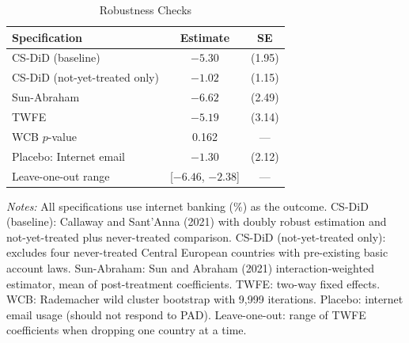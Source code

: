 \begin{table}[htbp]
\centering
\caption{Robustness Checks}
\label{tab:robustness}
\begin{tabular}{lcc}
\hline\hline
Specification & Estimate & SE \\
\hline
CS-DiD (baseline) & $-5.30$ & (1.95) \\
CS-DiD (not-yet-treated only) & $-1.02$ & (1.15) \\
Sun-Abraham & $-6.62$ & (2.49) \\
TWFE & $-5.19$ & (3.14) \\
WCB $p$-value & 0.162 & --- \\
Placebo: Internet email & $-1.30$ & (2.12) \\
Leave-one-out range & [$-6.46$, $-2.38$] & --- \\
\hline\hline
\end{tabular}
\begin{tablenotes}
\item \textit{Notes:} All specifications use internet banking (\%) as the outcome. CS-DiD (baseline): Callaway and Sant'Anna (2021) with doubly robust estimation and not-yet-treated plus never-treated comparison. CS-DiD (not-yet-treated only): excludes four never-treated Central European countries with pre-existing basic account laws. Sun-Abraham: Sun and Abraham (2021) interaction-weighted estimator, mean of post-treatment coefficients. TWFE: two-way fixed effects. WCB: Rademacher wild cluster bootstrap with 9,999 iterations. Placebo: internet email usage (should not respond to PAD). Leave-one-out: range of TWFE coefficients when dropping one country at a time.
\end{tablenotes}
\end{table}
